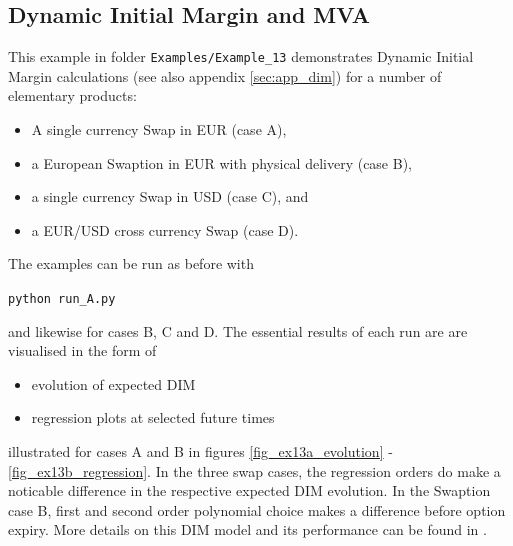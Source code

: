\documentclass[12pt, a4paper]{article}
\begin{document}
{%
\subsection{Dynamic Initial Margin and MVA}\label{sec:dim}

This example in folder {\tt Examples/Example\_13} demonstrates Dynamic Initial Margin calculations (see also appendix
\ref{sec:app_dim}) for a number of elementary products:
\begin{itemize}
\item A single currency Swap in EUR (case A), 
\item a European Swaption in EUR with physical delivery (case B), 
\item a single currency Swap in USD (case C), and 
\item a EUR/USD cross currency Swap (case D).
\end{itemize}

The examples can be run as before with 

\medskip
\centerline{\tt python run\_A.py} 

\medskip
and likewise for cases B, C and D. The essential results of each run are are visualised in the form of 
\begin{itemize}
\item evolution of expected DIM
\item regression plots at selected future times 
\end{itemize}
illustrated for cases A and B in figures \ref{fig_ex13a_evolution} - \ref{fig_ex13b_regression}. 
In the three swap cases, the regression orders do make a noticable difference in the respective expected DIM evolution. In the Swaption case B, first and second order polynomial choice makes a difference before option expiry. More details on this DIM model and its performance can be found in \cite{Anfuso2016,LichtersEtAl}.
 
}
\end{document}
